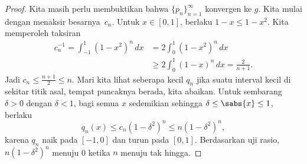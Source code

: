 \begin{proof}
Kita masih perlu membuktikan bahwa $\{ p_n \}_{n=1}^\infty$ konvergen ke $g$.
Kita mulai dengan menaksir besarnya~$c_n$.
Untuk $x \in [0,1]$, berlaku $1-x \leq 1-x^2$.  Kita memperoleh taksiran
\begin{equation*}
\begin{split}
c_n^{-1}   = \int_{-1}^1 {(1-x^2)}^n \, dx
& = 2\int_0^1 {(1-x^2)}^n \, dx \\
& \geq 2\int_0^{1} {(1-x)}^n \, dx
= \frac{2}{n+1} .
\end{split}
\end{equation*}
Jadi $c_n \leq \frac{n+1}{2} \leq n$.
Mari kita lihat seberapa kecil $q_n$ jika suatu interval kecil di sekitar titik asal,
tempat puncaknya berada, kita abaikan.
Untuk sembarang $\delta > 0$ dengan $\delta < 1$,
bagi semua
$x$ sedemikian sehingga $\delta \leq \sabs{x} \leq 1$, berlaku
\begin{equation*}
q_n(x) \leq c_n {(1-\delta^2)}^n \leq  n{(1-\delta^2)}^n ,
\end{equation*}
karena $q_n$ naik pada $[-1,0]$ dan turun pada $[0,1]$.
Berdasarkan uji rasio,
$n{(1-\delta^2)}^n$ menuju 0 ketika $n$ menuju tak hingga.


\end{proof}
